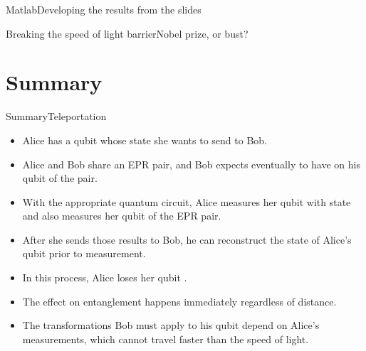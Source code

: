 \begin{frame}{Matlab}{Developing the results from the slides}
    
\end{frame}

\begin{frame}{Breaking the speed of light barrier}{Nobel prize, or bust?}
    
\end{frame}

\section*{Summary}
\begin{frame}{Summary}{Teleportation}

\begin{itemize}
    \item Alice has a qubit whose state  she wants to send to Bob.
    \item Alice and Bob share an EPR pair, and Bob expects eventually to have  on his qubit of the pair.
    \item With the appropriate quantum circuit, Alice measures her qubit with state  and also measures her qubit of the EPR pair.
    \item After she sends those results to Bob, he can reconstruct the state of Alice's qubit prior to measurement.
    \item In this process, Alice loses her qubit .
    \item The effect on entanglement happens immediately regardless of distance.
    \item The transformations Bob must apply to his qubit depend on Alice's measurements, which cannot travel faster than the speed of light.
\end{itemize}
    
\end{frame}
